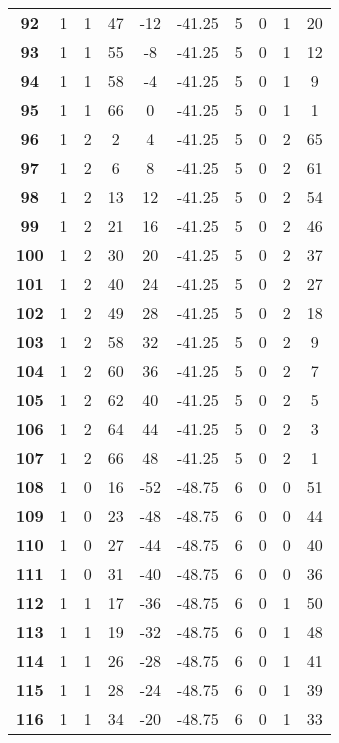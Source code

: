 \documentclass[12pt,letterpaper, onecolumn]{exam}
\begin{document}
\begin{longtable}{cccccccccc}
    \textbf{92} & 1 & 1 & 47 & -12 & -41.25 & 5 & 0 & 1 & 20 \\ 
    \textbf{93} & 1 & 1 & 55 & -8 & -41.25 & 5 & 0 & 1 & 12 \\ 
    \textbf{94} & 1 & 1 & 58 & -4 & -41.25 & 5 & 0 & 1 & 9 \\ 
    \textbf{95} & 1 & 1 & 66 & 0 & -41.25 & 5 & 0 & 1 & 1 \\ 
    \textbf{96} & 1 & 2 & 2 & 4 & -41.25 & 5 & 0 & 2 & 65 \\ 
    \textbf{97} & 1 & 2 & 6 & 8 & -41.25 & 5 & 0 & 2 & 61 \\ 
    \textbf{98} & 1 & 2 & 13 & 12 & -41.25 & 5 & 0 & 2 & 54 \\ 
    \textbf{99} & 1 & 2 & 21 & 16 & -41.25 & 5 & 0 & 2 & 46 \\ 
    \textbf{100} & 1 & 2 & 30 & 20 & -41.25 & 5 & 0 & 2 & 37 \\ 
    \textbf{101} & 1 & 2 & 40 & 24 & -41.25 & 5 & 0 & 2 & 27 \\ 
    \textbf{102} & 1 & 2 & 49 & 28 & -41.25 & 5 & 0 & 2 & 18 \\ 
    \textbf{103} & 1 & 2 & 58 & 32 & -41.25 & 5 & 0 & 2 & 9 \\ 
    \textbf{104} & 1 & 2 & 60 & 36 & -41.25 & 5 & 0 & 2 & 7 \\ 
    \textbf{105} & 1 & 2 & 62 & 40 & -41.25 & 5 & 0 & 2 & 5 \\ 
    \textbf{106} & 1 & 2 & 64 & 44 & -41.25 & 5 & 0 & 2 & 3 \\ 
    \textbf{107} & 1 & 2 & 66 & 48 & -41.25 & 5 & 0 & 2 & 1 \\ 
    \textbf{108} & 1 & 0 & 16 & -52 & -48.75 & 6 & 0 & 0 & 51 \\ 
    \textbf{109} & 1 & 0 & 23 & -48 & -48.75 & 6 & 0 & 0 & 44 \\ 
    \textbf{110} & 1 & 0 & 27 & -44 & -48.75 & 6 & 0 & 0 & 40 \\ 
    \textbf{111} & 1 & 0 & 31 & -40 & -48.75 & 6 & 0 & 0 & 36 \\ 
    \textbf{112} & 1 & 1 & 17 & -36 & -48.75 & 6 & 0 & 1 & 50 \\ 
    \textbf{113} & 1 & 1 & 19 & -32 & -48.75 & 6 & 0 & 1 & 48 \\ 
    \textbf{114} & 1 & 1 & 26 & -28 & -48.75 & 6 & 0 & 1 & 41 \\     \hline
    \textbf{115} & 1 & 1 & 28 & -24 & -48.75 & 6 & 0 & 1 & 39 \\ 
    \textbf{116} & 1 & 1 & 34 & -20 & -48.75 & 6 & 0 & 1 & 33 \\ 

\end{longtable}
\end{document}
